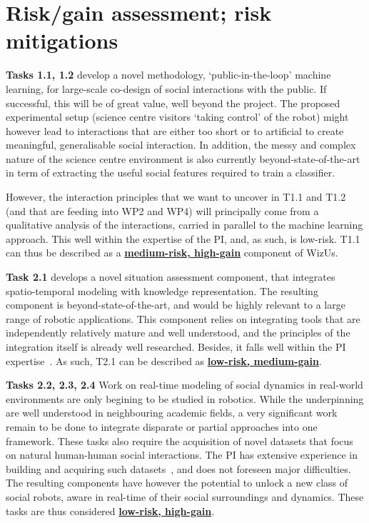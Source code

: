 \documentclass[11pt,a4paper]{report}
\newcommand{\project}{WizUs\xspace}
\begin{document}
\section{Risk/gain assessment; risk mitigations}\label{risks}

\textbf{Tasks 1.1, 1.2} develop a novel methodology, `public-in-the-loop' machine
learning, for large-scale co-design of social interactions with the public. If
successful, this will be of great value, well beyond the project. The
proposed experimental setup (science centre visitors `taking control' of the robot)
might however lead to interactions that are either too short or to artificial to
create meaningful, generalisable social interaction. In addition, the messy and
complex nature of the science centre environment is also currently beyond-state-of-the-art
in term of extracting the useful social features required to train a classifier.

However, the interaction principles that we want to uncover in T1.1 and T1.2
(and that are feeding into WP2 and WP4) will principally come from a qualitative
analysis of the interactions, carried in parallel to the machine learning
approach. This well within the expertise of the PI, and, as such, is low-risk.
T1.1 can thus be described as a \ul{\bf medium-risk, high-gain} component of
\project.

\vspace{1em}

\textbf{Task 2.1} develops a novel situation assessment component, that
integrates spatio-temporal modeling with knowledge representation. The resulting
component is beyond-state-of-the-art, and would be highly relevant to a large range
of robotic applications. This component relies on integrating tools that are
independently relatively mature and well understood, and the principles of the
integration itself is already well researched. Besides, it falls well within the
PI
expertise~\cite{lemaignan2018underworlds,sallami2019simulation,lemaignan2010oro}.
As such, T2.1 can be described as \ul{\bf low-risk, medium-gain}.

\textbf{Tasks 2.2, 2.3, 2.4} Work on real-time modeling of social dynamics in
real-world environments are only begining to be studied in robotics. While the
underpinning are well understood in neighbouring academic fields, a very
significant work remain to be done to integrate disparate or partial approaches
into one framework. These tasks also require the acquisition of novel datasets
that focus on natural human-human social interactions. The PI has extensive
experience in building and acquiring such
datasets~\cite{lemaignan2018pinsoro,sallami2020unexpected}, and does not
foreseen major difficulties. The resulting components have however the potential
to unlock a new class of social robots, aware in real-time of their social
surroundings and dynamics.  These tasks are thus considered \ul{\bf low-risk,
high-gain}.
\end{document}
